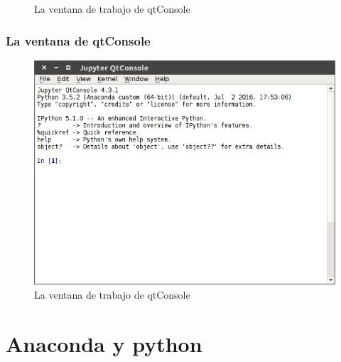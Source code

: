 {\begin{frame}
\begin{figure}
	\caption{La ventana de trabajo de qtConsole}
\end{figure}
\end{frame}
\begin{frame}
\frametitle{La ventana de qtConsole}
\begin{figure}
	\centering
	\includegraphics[scale=0.35]{qtConsole_01.png}
	\caption{La ventana de trabajo de qtConsole}
\end{figure}
\end{frame}
\section{Anaconda y python}
}
